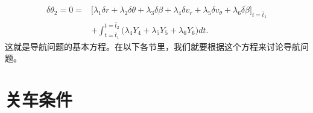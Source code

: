 \begin{equation}\label{eq:ch13_zero_range_error}
\begin{array}{ll}
\delta \theta_2 = 0 = &\bigl[ \lambda_1 \delta r + \lambda_2 \delta \theta + \lambda_3 \delta \beta + \lambda_4 \delta v_r + \lambda_5 \delta v_\theta + \lambda_6 \delta \dot{\beta} \bigr]_{t=\bar{t}_1}\\
& + \int_{t=\bar{t}_1}^{t=\bar{t}_2} \bigl( \lambda_4 Y_4 + \lambda_5 Y_5 + \lambda_6 Y_6 \bigr) dt.
\end{array}
\end{equation}
这就是导航问题的基本方程。在以下各节里，我们就要根据这个方程来讨论导航问题。

\section{关车条件}

